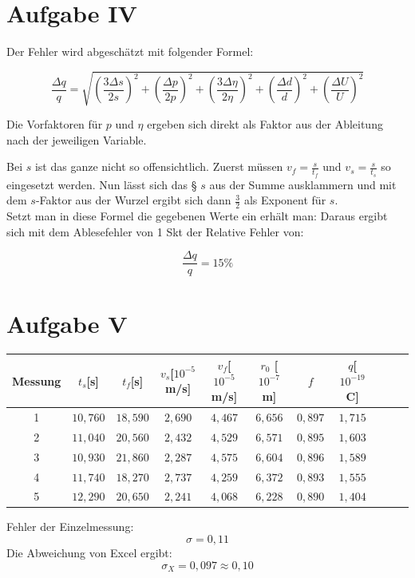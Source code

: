 \section{Aufgabe IV}
Der Fehler wird abgeschätzt mit folgender Formel:

\begin{equation}
    \frac{\Delta q}{q} = \sqrt{\left(\frac{3 \Delta s}{2s}\right)^2+\left(\frac{\Delta p}{2p}\right)^2+\left(\frac{3\Delta \eta}{2\eta}\right)^2+\left(\frac{\Delta d}{d}\right)^2+\left(\frac{\Delta U}{U}\right)^2}
\end{equation}

Die Vorfaktoren für $p$ und $\eta$ ergeben sich direkt als Faktor aus der Ableitung nach der jeweiligen Variable.

Bei $s$ ist das ganze nicht so offensichtlich. Zuerst müssen $v_f=\frac{s}{t_f}$ und $v_s=\frac{s}{t_s}$ so eingesetzt werden. Nun lässt sich das §
$s$ aus der Summe ausklammern und mit dem $s$-Faktor aus der Wurzel ergibt sich dann $\frac{3}{2}$ als Exponent für $s$. \\
Setzt man in diese Formel die gegebenen Werte ein erhält man:
Daraus ergibt sich mit dem Ablesefehler von 1 Skt der Relative Fehler von:

\[\boxed{\frac{\Delta q}{q} = 15\%}\]

\section{Aufgabe V}

\begin{table}[h!]
    \centering
    \begin{tabular}{c c c c c c c c c c c}
        \hline
        Messung &  $t_s$[s] &  $t_f$[s] & $v_s$[$10^{-5}$ m/s] & $v_f$[$10^{-5}$m/s] & $r_0$ [$10^{-7}$m] & $f$ & $q$[$10^{-19}$ C] \\
        \hline
        1 & $10,760$ & $18,590$ & $2,690 $ & $ 4,467$ & $6,656 $ & $ 0,897$ & $ 1,715$\\
        2 & $11,040$ & $20,560$ & $2,432 $ & $ 4,529$ & $6,571 $ & $ 0,895$ & $ 1,603$\\
        3 & $10,930$ & $21,860$ & $2,287 $ & $ 4,575$ & $6,604 $ & $ 0,896$ & $ 1,589$\\ 
        4 & $11,740$ & $18,270$ & $2,737 $ & $ 4,259$ & $6,372 $ & $ 0,893$ & $ 1,555$\\
        5 & $12,290$ & $20,650$ & $2,241 $ & $ 4,068$ & $6,228 $ & $ 0,890$ & $ 1,404$\\
        \hline
    \end{tabular}
\end{table}
Fehler der Einzelmessung:
\[ \sigma = 0,11 \]
Die Abweichung von Excel ergibt:
\[ \sigma_X = 0,097 \approx 0,10\]


